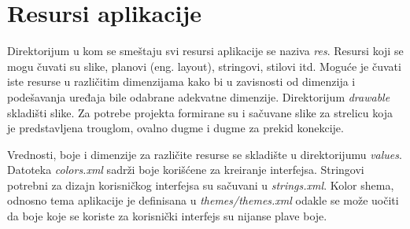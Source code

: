 \documentclass[implementacija.tex]{subfiles}
\begin{document}
\section{Resursi aplikacije}
Direktorijum u kom se smeštaju svi resursi aplikacije se naziva \textit{res}. Resursi koji se mogu čuvati su slike, planovi (eng. layout), stringovi, stilovi itd. Moguće je čuvati iste resurse u različitim dimenzijama kako bi u zavisnosti od dimenzija i podešavanja uređaja bile odabrane adekvatne dimenzije. Direktorijum \textit{drawable} skladišti slike. Za potrebe projekta formirane su i sačuvane slike za strelicu koja je predstavljena trouglom, ovalno dugme i dugme za prekid konekcije. 

Vrednosti, boje i dimenzije za različite resurse se skladište u direktorijumu \textit{values}. Datoteka \textit{colors.xml} sadrži boje korišćene za kreiranje interfejsa. Stringovi potrebni za dizajn korisničkog interfejsa su sačuvani u \textit{strings.xml}. Kolor shema, odnosno tema aplikacije je definisana u \textit{themes/themes.xml} odakle se može uočiti da boje koje se koriste za korisnički interfejs su nijanse plave boje. 
\end{document}
